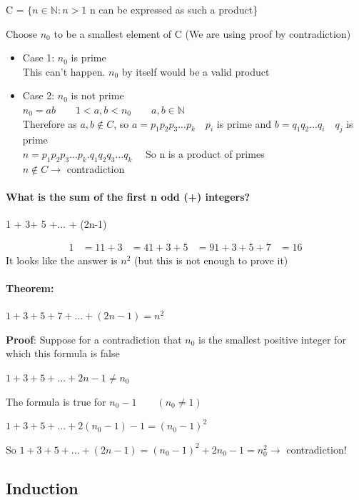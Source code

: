 \documentclass[9pt, letterpaper, oneside]{article}
\begin{document}
C = $\{n \in \mathbb{N} : n > 1$ n can be expressed as such a product\}

Choose $n_0$ to be a smallest element of C (We are using proof by contradiction)

\begin{itemize}
	\item Case 1: $n_0$ is prime \\
	This can't happen. $n_0$ by itself would be a valid product
	\item Case 2: $n_0$ is not prime \\
	      $n_0 = ab \qquad 1 < a,b < n_0 \qquad a,b \in \mathbb{N}$ \\
	      Therefore as $a, b \notin C$, so $a = p_1p_2p_3...p_k \quad p_i$ is prime and 
	      						$b = q_1q_2 ... q_i \quad q_j$ is prime \\
	       $n = p_1p_2p_3...p_k . q_1q_2q_3...q_k \quad$ So n is a product of primes \\
	       $n \notin C \to$ contradiction
\end{itemize}

\paragraph{What is the sum of the first n odd (+) integers?}

1 + 3+ 5 +... + (2n-1)

\begin{align*}
1 &= 1
1 + 3 &= 4
1 + 3 + 5 &= 9
1+ 3 + 5 + 7 &= 16
\end{align*}
It looks like the answer is $n^2$ (but this is not enough to prove it)

\paragraph{Theorem:} $1 + 3 + 5 + 7 + ... + (2n-1) = n^2$

\textbf{Proof}: Suppose for a contradiction that $n_0$ is the smallest positive integer for which this formula is false

$1 + 3 + 5 + ... + 2n -1 \neq n_0$

The formula is true for $n_0 -1 \qquad (n_0 \neq 1)$

$1 + 3 + 5 + ... + 2(n_0 -1) -1 = (n_0 - 1)^2$

So $1 + 3 + 5  + ...+ (2n-1) = (n_0 -1)^2 + 2n_0 -1 = n_0^2 \to$ contradiction!

\subsection{Induction}
\end{document}
